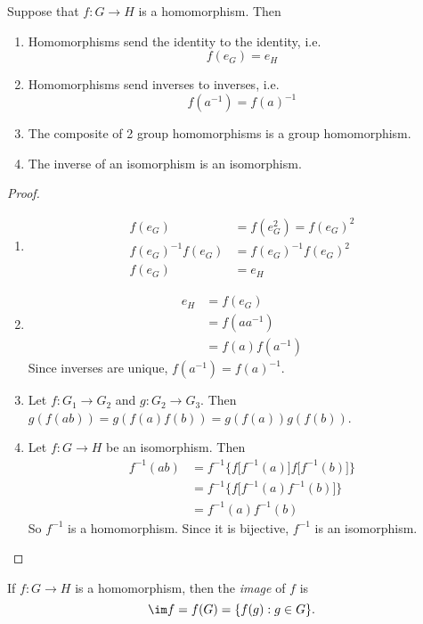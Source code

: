 \documentclass[a4paper]{article}
\begin{document}
\begin{prop}
  Suppose that $f: G\rightarrow H$ is a homomorphism. Then
  \begin{enumerate}
    \item Homomorphisms send the identity to the identity, i.e.
      \[
        f(e_G) = e_H
      \]
    \item Homomorphisms send inverses to inverses, i.e.
      \[
        f(a^{-1}) = f(a)^{-1}
      \]
    \item The composite of 2 group homomorphisms is a group homomorphism.
    \item The inverse of an isomorphism is an isomorphism.
  \end{enumerate}
\end{prop}
\begin{proof}\leavevmode
  \begin{enumerate}
    \item \begin{align*}
        f(e_G) &= f(e_G^2) = f(e_G)^2\\
        f(e_G)^{-1}f(e_G) &= f(e_G)^{-1}f(e_G)^2\\
        f(e_G) &= e_H
      \end{align*}
    \item \begin{align*}
        e_H &= f(e_G)\\
        &= f(aa^{-1})\\
        &= f(a)f(a^{-1})
      \end{align*}
      Since inverses are unique, $f(a^{-1}) = f(a)^{-1}$.
    \item Let $f:G_1 \rightarrow G_2$ and $g:G_2 \rightarrow G_3$. Then $g(f(ab)) = g(f(a)f(b)) = g(f(a))g(f(b))$.
    \item Let $f:G \rightarrow H$ be an isomorphism. Then
      \begin{align*}
        f^{-1}(ab) &= f^{-1}\Big\{f\big[f^{-1}(a)\big]f\big[f^{-1}(b)\big]\Big\}\\
        &= f^{-1}\Big\{f\big[f^{-1}(a)f^{-1}(b)\big]\Big\}\\
        &= f^{-1}(a)f^{-1}(b)
      \end{align*}
      So $f^{-1}$ is a homomorphism. Since it is bijective, $f^{-1}$ is an isomorphism.
  \end{enumerate}
\end{proof}

\begin{defi}
  If $f:G\rightarrow H$ is a homomorphism, then the \emph{image} of $f$ is
  \[
    \im f = f(G) = \{f(g):g\in G\}.
  \]
\end{defi}
\end{document}
